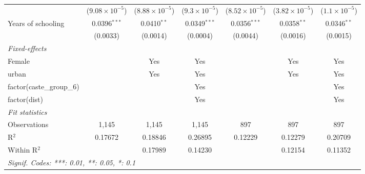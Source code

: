 \begin{table}[htbp]
\begin{adjustbox}{width = \textwidth, center}
\begin{tabular}{lcccccc}
                                   & ($9.08\times 10^{-5}$)  & ($8.88\times 10^{-5}$)  & ($9.3\times 10^{-5}$)  & ($8.52\times 10^{-5}$)  & ($3.82\times 10^{-5}$)  & ($1.1\times 10^{-5}$)\\    
         Years of schooling        & 0.0396$^{***}$          & 0.0410$^{**}$           & 0.0349$^{***}$         & 0.0356$^{***}$          & 0.0358$^{**}$           & 0.0346$^{**}$\\   
                                   & (0.0033)                & (0.0014)                & (0.0004)               & (0.0044)                & (0.0016)                & (0.0015)\\   
         \midrule
         \emph{Fixed-effects}\\
         Female                    &                         & Yes                     & Yes                    &                         & Yes                     & Yes\\  
         urban                     &                         & Yes                     & Yes                    &                         & Yes                     & Yes\\  
         factor(caste\_group\_6)   &                         &                         & Yes                    &                         &                         & Yes\\  
         factor(dist)              &                         &                         & Yes                    &                         &                         & Yes\\  
         \midrule
         \emph{Fit statistics}\\
         Observations              & 1,145                   & 1,145                   & 1,145                  & 897                     & 897                     & 897\\  
         R$^2$                     & 0.17672                 & 0.18846                 & 0.26895                & 0.12229                 & 0.12279                 & 0.20709\\  
         Within R$^2$              &                         & 0.17989                 & 0.14230                &                         & 0.12154                 & 0.11352\\  
         \midrule \midrule
         \multicolumn{7}{l}{\emph{Signif. Codes: ***: 0.01, **: 0.05, *: 0.1}}\\
      \end{tabular}
   \end{adjustbox}
\end{table}


